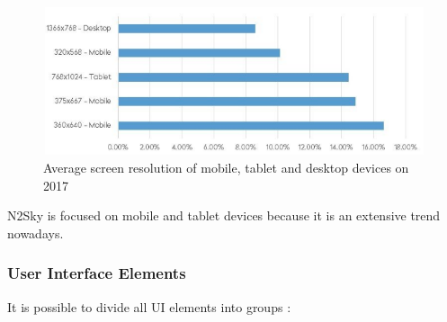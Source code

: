 \begin{figure}[htbp]
\begin{center}
  \includegraphics[scale=0.65]{components/3/components/screen.png}
  \caption{Average screen resolution of mobile, tablet and desktop devices on 2017}
  \label{fig:screen}
\end{center}
\end{figure}

N2Sky is focused on mobile and tablet devices because it is an extensive trend nowadays. 

\subsubsection{User Interface Elements}\label{User Interface Elements}

It is possible to divide all UI elements into groups \cite{intelligent_support}:

